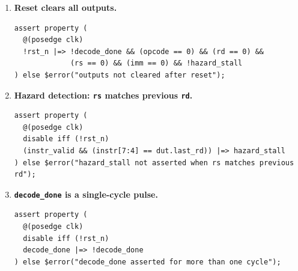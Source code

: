 \documentclass[11pt,a4paper]{article}
\begin{document}
\begin{enumerate}
\item \textbf{Reset clears all outputs.}
\begin{lstlisting}
assert property (
  @(posedge clk)
  !rst_n |=> !decode_done && (opcode == 0) && (rd == 0) &&
             (rs == 0) && (imm == 0) && !hazard_stall
) else $error("outputs not cleared after reset");
\end{lstlisting}

\item \textbf{Hazard detection: \texttt{rs} matches previous \texttt{rd}.}
\begin{lstlisting}
assert property (
  @(posedge clk)
  disable iff (!rst_n)
  (instr_valid && (instr[7:4] == dut.last_rd)) |=> hazard_stall
) else $error("hazard_stall not asserted when rs matches previous rd");
\end{lstlisting}

\item \textbf{\texttt{decode\_done} is a single-cycle pulse.}
\begin{lstlisting}
assert property (
  @(posedge clk)
  disable iff (!rst_n)
  decode_done |=> !decode_done
) else $error("decode_done asserted for more than one cycle");
\end{lstlisting}

\end{enumerate}
\end{document}
